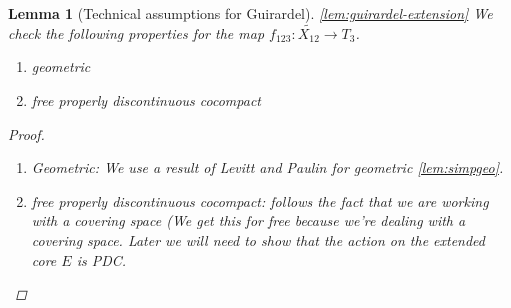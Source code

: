 \documentclass{article}
\theoremstyle{mystyle}
\newtheorem{lem}[thm]{Lemma}
\theoremstyle{remark}
\begin{document}
\begin{lem}
[Technical assumptions for Guirardel]
    \label{lem:technicalconditions}
 \ref{lem:guirardel-extension} We check the following properties for the map $f_{123}: \widetilde{X_{12}}\to T_3$.
    \begin{enumerate}
        \item geometric
        \item free properly discontinuous cocompact
        
    \end{enumerate}
    \label{lem:measuredetc} 
    
    \begin{proof}
    \begin{enumerate}
        \item Geometric: We use a result of Levitt and Paulin for geometric \ref{lem:simpgeo}.
        \item free properly discontinuous cocompact: follows the fact that we are working with a covering space (We get this for free because we're dealing with a covering space. Later we will need to show that the action on the extended core $E$ is PDC.
    \end{enumerate}
    \end{proof}
\end{lem}
\end{document}
